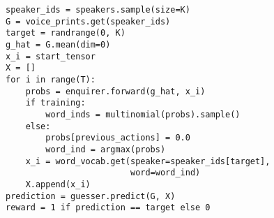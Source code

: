 \begin{lstlisting}[caption={Интерактивная игра для обучения \enquirer{}}]
speaker_ids = speakers.sample(size=K)
G = voice_prints.get(speaker_ids)
target = randrange(0, K)
g_hat = G.mean(dim=0)
x_i = start_tensor
X = []
for i in range(T):
    probs = enquirer.forward(g_hat, x_i)
    if training:
        word_inds = multinomial(probs).sample()
    else:
        probs[previous_actions] = 0.0
        word_ind = argmax(probs)
    x_i = word_vocab.get(speaker=speaker_ids[target],
                         word=word_ind)
    X.append(x_i)
prediction = guesser.predict(G, X)
reward = 1 if prediction == target else 0
\end{lstlisting}